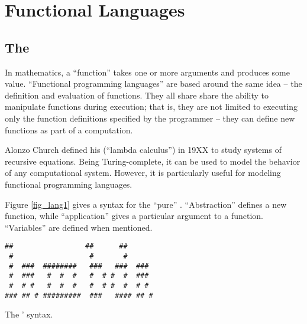 \documentclass[12pt]{report}
\begin{document}


\chapter{Functional Languages}
\label{ref_chapter_languages}


\section{The \LamA}

In mathematics, a ``function'' takes one or more arguments and
produces some value. ``Functional programming languages'' are based
around the same idea -- the definition and evaluation of
functions. They all share share the ability to manipulate functions
during execution; that is, they are not limited to executing only the
function definitions specified by the programmer -- they can define
new functions as part of a computation.


Alonzo Church defined his \lamA (``lambda calculus'') in 19XX
\citep{ChurchXX} to study systems of recursive equations. Being
Turing-complete, it can be used to model the behavior of any
computational system. However, it is particularly useful for modeling
functional programming languages. %

Figure \ref{fig_lang1} gives a syntax for the ``pure''
\lamA. ``Abstraction'' defines a new function, while ``application''
gives a particular argument to a function. ``Variables'' are defined
when mentioned. 

\begin{myfig}[ht]
\begin{minipage}{3in}
\begin{Verbatim}
##                 ##      ##       
 #                  #       #       
 #  ###  ########   ###   ###  ###  
 #  ###   #  #  #   #  # #  #  ###  
 #  # #   #  #  #   #  # #  #  # #  
### ## # #########  ###   #### ## # 
\end{Verbatim}
\end{minipage}
  \caption{The \lamA' syntax.}
  \label{fig_lang1}
\end{myfig}

\end{document}
